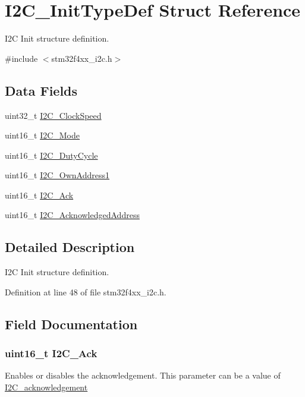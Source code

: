\hypertarget{struct_i2_c___init_type_def}{\section{I2\-C\-\_\-\-Init\-Type\-Def Struct Reference}
\label{struct_i2_c___init_type_def}
}


I2\-C Init structure definition.  




{\ttfamily \#include $<$stm32f4xx\-\_\-i2c.\-h$>$}

\subsection*{Data Fields}
\begin{DoxyCompactItemize}
\item 
uint32\-\_\-t \hyperlink{struct_i2_c___init_type_def_af8d72d15cd29b7e69591ce3edab497f6}{I2\-C\-\_\-\-Clock\-Speed}
\item 
uint16\-\_\-t \hyperlink{struct_i2_c___init_type_def_a165269b65702e348e32ccd8029e65af1}{I2\-C\-\_\-\-Mode}
\item 
uint16\-\_\-t \hyperlink{struct_i2_c___init_type_def_a349afc2bb8534c072349a6061f29344a}{I2\-C\-\_\-\-Duty\-Cycle}
\item 
uint16\-\_\-t \hyperlink{struct_i2_c___init_type_def_ae62dca9cea4fdb3eb8f9554b5f35fe4f}{I2\-C\-\_\-\-Own\-Address1}
\item 
uint16\-\_\-t \hyperlink{struct_i2_c___init_type_def_ab21d61d68d06e97d7c0ab90c8e396464}{I2\-C\-\_\-\-Ack}
\item 
uint16\-\_\-t \hyperlink{struct_i2_c___init_type_def_af46be2bc866a7dbf0d529dd770b105b3}{I2\-C\-\_\-\-Acknowledged\-Address}
\end{DoxyCompactItemize}


\subsection{Detailed Description}
I2\-C Init structure definition. 

Definition at line 48 of file stm32f4xx\-\_\-i2c.\-h.



\subsection{Field Documentation}
\hypertarget{struct_i2_c___init_type_def_ab21d61d68d06e97d7c0ab90c8e396464}{
\subsubsection[{I2\-C\-\_\-\-Ack}]{\setlength{\rightskip}{0pt plus 5cm}uint16\-\_\-t I2\-C\-\_\-\-Ack}}\label{struct_i2_c___init_type_def_ab21d61d68d06e97d7c0ab90c8e396464}
Enables or disables the acknowledgement. This parameter can be a value of \hyperlink{group___i2_c__acknowledgement}{I2\-C\-\_\-acknowledgement} 

